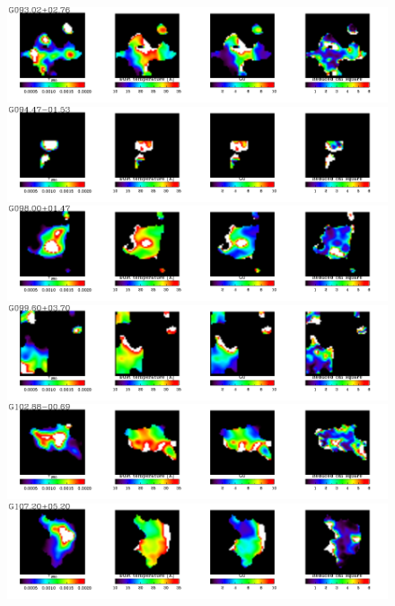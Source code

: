   \begin{figure}
\centering
\includegraphics[trim=0 2mm 0 0, clip, width=190mm]{appA/appA_24.pdf}
\includegraphics[trim=0 2mm 0 0, clip, width=190mm]{appA/appA_25.pdf}
\includegraphics[trim=0 2mm 0 0, clip, width=190mm]{appA/appA_26.pdf}
\includegraphics[trim=0 2mm 0 0, clip, width=190mm]{appA/appA_27.pdf}
\includegraphics[trim=0 2mm 0 0, clip, width=190mm]{appA/appA_28.pdf}
\includegraphics[trim=0 2mm 0 0, clip, width=190mm]{appA/appA_29.pdf}
  \end{figure}
  
